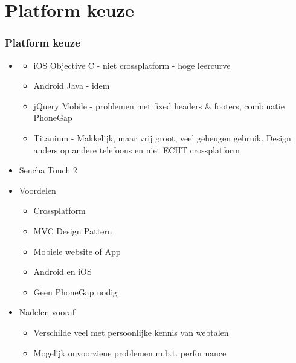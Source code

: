 \documentclass[10pt,a4paper]{beamer}
\begin{document}
\section{Platform keuze}
\begin{frame}
\frametitle{Platform keuze}
\begin{itemize}
\item 
	\begin{itemize}
		\item iOS Objective C - niet crossplatform - hoge leercurve
			\item Android Java - idem
		\item jQuery Mobile -  problemen met fixed headers \& footers, combinatie PhoneGap
		\item Titanium - Makkelijk, maar vrij groot, veel geheugen gebruik. Design anders op andere telefoons en niet ECHT crossplatform
	\end{itemize}
\item Sencha Touch 2
\item Voordelen
		\begin{itemize}
		\item Crossplatform
		\item MVC Design Pattern
		\item Mobiele website of App
		\item Android en iOS
		\item Geen PhoneGap nodig
		\end{itemize}
\item Nadelen vooraf
		\begin{itemize}
				\item Verschilde veel met persoonlijke kennis van webtalen
				\item Mogelijk onvoorziene problemen m.b.t. performance
		\end{itemize}
\end{itemize}
\end{frame}
\end{document}
